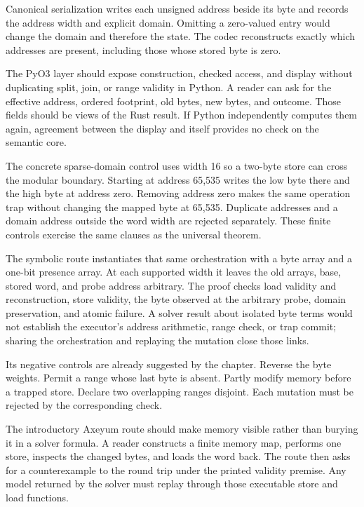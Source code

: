 Canonical serialization writes each unsigned address beside its byte and
records the address width and explicit domain. Omitting a zero-valued entry
would change the domain and therefore the state. The codec reconstructs exactly
which addresses are present, including those whose stored byte is zero.

The PyO3 layer should expose construction, checked access, and display without
duplicating split, join, or range validity in Python. A reader can ask for
the effective address, ordered footprint, old bytes, new bytes, and outcome.
Those fields should be views of the Rust result. If Python independently
computes them again, agreement between the display and itself provides no check on
the semantic core.

The concrete sparse-domain control uses width 16 so a two-byte store can cross
the modular boundary. Starting at address 65,535 writes the low byte there and
the high byte at address zero. Removing address zero makes the same operation
trap without changing the mapped byte at 65,535. Duplicate addresses and a
domain address outside the word width are rejected separately. These finite
controls exercise the same clauses as the universal theorem.

The symbolic route instantiates that same orchestration with a byte array and a
one-bit presence array. At each supported width it leaves the old arrays, base,
stored word, and probe address arbitrary. The proof checks load validity and
reconstruction, store validity, the byte observed at the arbitrary probe,
domain preservation, and atomic failure. A solver result about isolated byte
terms would not establish the executor's address arithmetic, range check, or
trap commit; sharing the orchestration and replaying the mutation close those
links.

Its negative controls are already suggested by the chapter. Reverse the byte
weights. Permit a range whose last byte is absent. Partly modify memory before
a trapped store. Declare two overlapping ranges disjoint. Each mutation must
be rejected by the corresponding check.

The introductory Axeyum route should make memory visible rather than burying
it in a solver formula. A reader constructs a finite memory map, performs one
store, inspects the changed bytes, and loads the word back. The route then
asks for a counterexample to the round trip under the printed validity
premise. Any model returned by the solver must replay through those executable
store and load functions.

